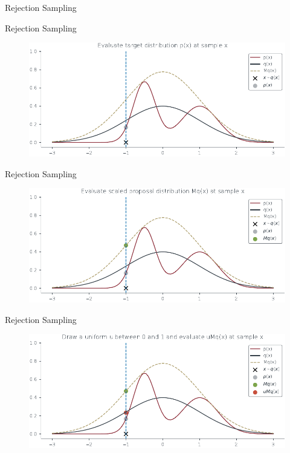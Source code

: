 \documentclass{beamer}
\begin{document}
\begin{section}{Rejection Sampling}
    \begin{frame}{Rejection Sampling}
        \begin{figure}
            \centering
            \includegraphics[scale = 0.75]{../figures/sampling/rejection-sampling--1.0-True-True-True-True-True-False-False-False.pdf}
        \end{figure}
    \end{frame}

    \begin{frame}{Rejection Sampling}
        \begin{figure}
            \centering
            \includegraphics[scale = 0.75]{../figures/sampling/rejection-sampling--1.0-True-True-True-True-True-True-False-False.pdf}
        \end{figure}
    \end{frame}

    \begin{frame}{Rejection Sampling}
        \begin{figure}
            \centering
            \includegraphics[scale = 0.75]{../figures/sampling/rejection-sampling--1.0-True-True-True-True-True-True-True-False.pdf}
        \end{figure}
    \end{frame}


\end{section}
\end{document}
